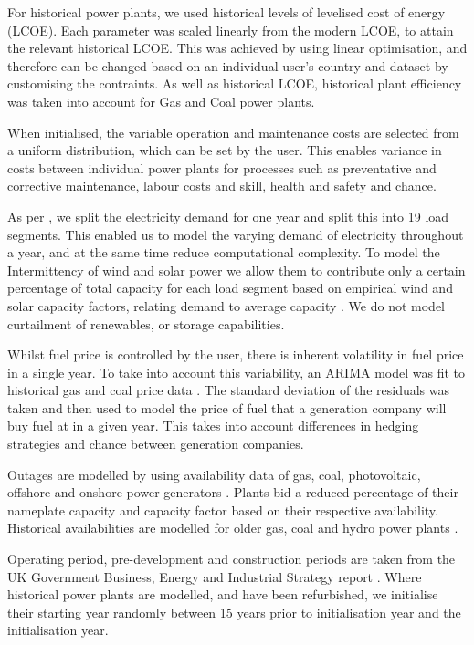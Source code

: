 For historical power plants, we used historical levels of levelised cost of energy (LCOE). Each parameter was scaled linearly from the modern LCOE, to attain the relevant historical LCOE. This was achieved by using linear optimisation, and therefore can be changed based on an individual user's country and dataset by customising the contraints. As well as historical LCOE, historical plant efficiency was taken into account for Gas and Coal power plants.

When initialised, the variable operation and maintenance costs are selected from a uniform distribution, which can be set by the user. This enables variance in costs between individual power plants for processes such as preventative and corrective maintenance, labour costs and skill, health and safety and chance.  

As per \cite{Chappin2017}, we split the electricity demand for one year and split this into 19 load segments. This enabled us to model the varying demand of electricity throughout a year, and at the same time reduce computational complexity. To model the Intermittency of wind and solar power we allow them to contribute only a certain percentage of total capacity for each load segment based on empirical wind and solar capacity factors, relating demand to average capacity \cite{Pfenninger2016, Staffell2016, Chappin2017}. We do not model curtailment of renewables, or storage capabilities.

Whilst fuel price is controlled by the user, there is inherent volatility in fuel price in a single year. To take into account this variability, an ARIMA model was fit to historical gas and coal price data \cite{coalprices,gasprices}. The standard deviation of the residuals was taken and then used to model the price of fuel that a generation company will buy fuel at in a given year. This takes into account differences in hedging strategies and chance between generation companies.

Outages are modelled by using availability data of gas, coal, photovoltaic, offshore and onshore power generators \cite{Ltd2016, Hunt2015, carroll-j}. Plants bid a reduced percentage of their nameplate capacity and capacity factor based on their respective availability. Historical availabilities are modelled for older gas, coal and hydro power plants \cite{AlbertaSystemElectricOperator2016}.

Operating period, pre-development and construction periods are taken from the UK Government Business, Energy and Industrial Strategy report \cite{Department2016}. Where historical power plants are modelled, and have been refurbished, we initialise their starting year randomly between 15 years prior to initialisation year and the initialisation year.

